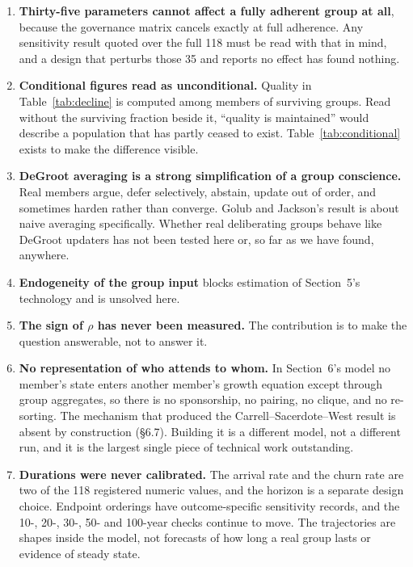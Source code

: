 \documentclass[11pt,a4paper]{article}
\begin{document}
\begin{enumerate}
\item \textbf{Thirty-five parameters cannot affect a fully adherent group at all},
because the governance matrix cancels exactly at full adherence. Any sensitivity
result quoted over the full 118 must be read with that in mind, and a design that
perturbs those 35 and reports no effect has found nothing.

\item \textbf{Conditional figures read as unconditional.} Quality in
Table~\ref{tab:decline} is computed among members of surviving groups. Read
without the surviving fraction beside it, ``quality is maintained'' would describe
a population that has partly ceased to exist. Table~\ref{tab:conditional} exists
to make the difference visible.

\item \textbf{DeGroot averaging is a strong simplification of a group
conscience.} Real members argue, defer selectively, abstain, update out of order,
and sometimes harden rather than converge. Golub and Jackson's result is about
naive averaging specifically. Whether real deliberating groups behave like DeGroot
updaters has not been tested here or, so far as we have found, anywhere.

\item \textbf{Endogeneity of the group input} blocks estimation of Section~5's
technology and is unsolved here.

\item \textbf{The sign of $\rho$ has never been measured.} The contribution is to
make the question answerable, not to answer it.

\item \textbf{No representation of who attends to whom.} In Section~6's model no
member's state enters another member's growth equation except through group
aggregates, so there is no sponsorship, no pairing, no clique, and no
re-sorting. The mechanism that produced the Carrell--Sacerdote--West result is
absent by construction (\S6.7). Building it is a different model, not a different
run, and it is the largest single piece of technical work outstanding.

\item \textbf{Durations were never calibrated.} The arrival rate and the
churn rate are two of the 118 registered numeric values, and the horizon is a separate
design choice. Endpoint orderings
have outcome-specific sensitivity records, and the 10-, 20-, 30-, 50- and
100-year checks continue to move. The trajectories are shapes inside the model,
not forecasts of how long a real group lasts or evidence of steady state.


\end{enumerate}
\end{document}
